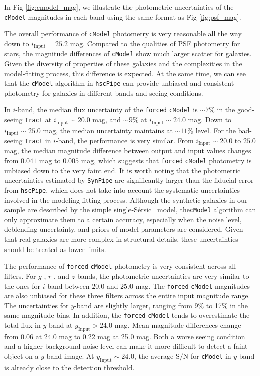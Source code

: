 \documentclass[useamsfonts]{pasj01}
\def\ser{{S\'{e}rsic\ }}
\def\hscpipe{\texttt{hscPipe}}
\def\synpipe{\texttt{SynPipe}}
\def\cmodel{\texttt{cModel}}
\def\forced{\texttt{forced}}
\def\tract{\texttt{Tract}}
\def\s2n{{$\mathrm{S}/\mathrm{N}$}}
\newcommand{\plus}{\raisebox{.4\height}{\scalebox{.6}{+}}}
\newcommand{\minus}{\raisebox{.4\height}{\scalebox{.8}{-}}}
\begin{document}
    In Fig \ref{fig:cmodel_mag}, we illustrate the photometric uncertainties of the
    \cmodel{} magnitudes in each band using the same format as
    Fig \ref{fig:psf_mag}.

    The overall performance of \cmodel{} photometry is very reasonable all the way
    down to $i_{\mathrm{Input}}=25.2$ mag.
    Compared to the qualities of PSF photometry for stars, the magnitude differences
    of \cmodel{} show much larger scatter for galaxies.
    Given the diversity of properties of these galaxies and the complexities in the
    model-fitting process, this difference is expected.
    At the same time, we can see that the \cmodel{} algorithm in \hscpipe{} can
    provide unbiased and consistent photometry for galaxies in different bands and
    seeing conditions.

    In $i$-band, the median flux uncertainty of the \forced{} \cmodel{} is ${\sim}7$\%
    in the good-seeing \tract{} at $i_{\mathrm{Input}}{\sim}20.0$ mag,
    and ${\sim}9$\% at $i_{\mathrm{Input}}{\sim}24.0$ mag.
    Down to $i_{\mathrm{Input}}{\sim}25.0$ mag, the median uncertainty maintains
    at ${\sim}11$\% level.
    For the bad-seeing \tract{} in $i$-band, the performance is very similar.
    From $i_{\mathrm{Input}}{\sim}20.0$ to $25.0$ mag, the median magnitude difference
    between output and input values changes from \plus{}$0.041$ mag to
    \minus{}$0.005$ mag, which suggests that \forced{} \cmodel{} photometry is
    unbiased down to the very faint end.
    It is worth noting that the photometric uncertainties estimated by \synpipe{}
    are significantly larger than the fiducial error from \hscpipe{}, which does not
    take into account the systematic uncertainties involved in the modeling
    fitting process.
    Although the synthetic galaxies in our sample are described by the simple single-\ser{}
    model, the\cmodel{} algorithm can only approximate them to a certain accuracy,
    especially when the noise level, deblending uncertainty, and priors of model
    parameters are considered.
    Given that real galaxies are more complex in structural details, these
    uncertainties should be treated as lower limits.

    The performance of \forced{} \cmodel{} photometry is very consistent across all
    filters.
    For $g$-, $r$-, and $z$-bands, the photometric uncertainties are very similar to
    the ones for $i$-band between $20.0$ and $25.0$ mag.
    The \forced{} \cmodel{} magnitudes are also unbiased for these three filters
    across the entire input magnitude range.
    The uncertainties for $y$-band are slightly larger, ranging from 9\% to 17\% in the
    same magnitude bins.
    In addition, the \forced{} \cmodel{} tends to overestimate the total flux in $y$-band
    at $y_{\mathrm{Input}}>24.0$ mag.
    Mean magnitude differences change from \minus{}0.06 at 24.0 mag to \minus{}0.22
    mag at 25.0 mag.
    Both a worse seeing condition and a higher background noise level can make it more
    difficult to detect a faint object on a $y$-band image.
    At $y_{\mathrm{Input}}{\sim}24.0$, the average \s2n{} for \cmodel{} in $y$-band
    is already close to the detection threshold.
\end{document}
